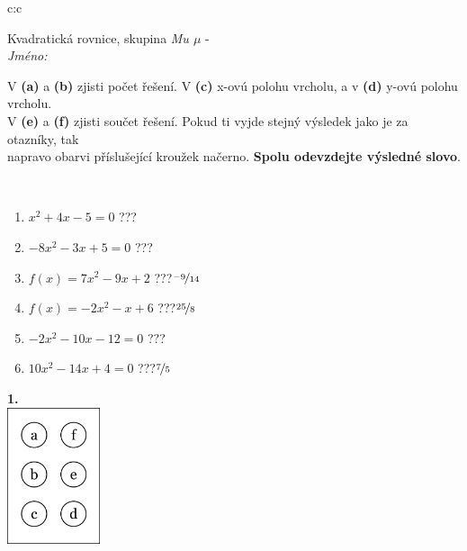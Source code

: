 \documentclass[10pt]{report}
\begin{document}
\begin{tabular}{c:c}
\begin{minipage}[c][104.5mm][t]{0.5\linewidth}
\begin{center}
\vspace{7mm}
{\huge Kvadratická rovnice, skupina \textit{Mu $\mu$} -}\\[5mm]
\textit{Jméno:}\phantom{xxxxxxxxxxxxxxxxxxxxxxxxxxxxxxxxxxxxxxxxxxxxxxxxxxxxxxxxxxxxxxxxx}\\[5mm]
\begin{minipage}{0.95\linewidth}
\begin{center}
V \textbf{(a)} a \textbf{(b)} zjisti počet řešení. V \textbf{(c)} x-ovú polohu vrcholu, a v \textbf{(d)} y-ovú polohu vrcholu.\\V \textbf{(e)} a \textbf{(f)} zjisti součet řešení. Pokud ti vyjde stejný výsledek jako je za otazníky, tak\\napravo obarvi příslušející kroužek načerno. \textbf{Spolu odevzdejte výsledné slovo}.
\end{center}
\end{minipage}
\\[1mm]
\begin{minipage}{0.79\linewidth}
\begin{center}
\begin{varwidth}{\linewidth}
\begin{enumerate}
\Large
\item $x^2+4x-5=0$\quad \dotfill\; ???\;\dotfill {}
\item $-8x^2-3x+5=0$\quad \dotfill\; ???\;\dotfill {}
\item $f(x)=7x^2-9x+2$\quad \dotfill\; ???\;\dotfill \quad $\nicefrac{-9}{14}$
\item $f(x)=-2x^2-x+6$\quad \dotfill\; ???\;\dotfill \quad $\nicefrac{25}{8}$
\item $-2x^2-10x-12=0$\quad \dotfill\; ???\;\dotfill {}
\item $10x^2-14x+4=0$\quad \dotfill\; ???\;\dotfill \quad $\nicefrac{7}{5}$
\end{enumerate}
\end{varwidth}
\end{center}
\end{minipage}
\begin{minipage}{0.20\linewidth}
\begin{center}
{\Huge\bfseries 1.} \\[2mm]
\includegraphics[height=40mm]{../images/braille.png}

\end{center}
\end{minipage}
\end{center}
\end{minipage}
\end{tabular}
\end{document}
